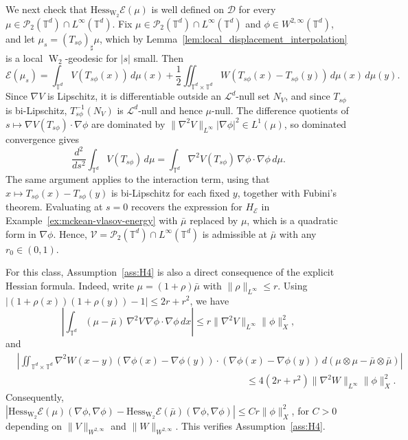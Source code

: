 \documentclass[11pt]{article}
\numberwithin{equation}{section}
\theoremstyle{definition}
\newcommand{\T}{\mathbb{T}}
\newcommand{\Pcal}{\mathcal{P}}
\newcommand{\E}{\mathcal{E}}
\newcommand{\Wtwo}{\operatorname{W}_2}
\begin{document}
We next check that $\mathrm{Hess}_{\Wtwo}\E(\mu)$ is well defined on $\mathscr{D}$ for every $\mu \in \Pcal_2(\T^d) \cap L^\infty(\T^d)$.
Fix $\mu \in \Pcal_2(\T^d) \cap L^\infty(\T^d)$ and $\phi \in W^{2,\infty}(\T^d)$, and let $\mu_s = (T_{s\phi})_\sharp\mu$, which by Lemma~\ref{lem:local_displacement_interpolation} is a
local $\Wtwo$-geodesic for $|s|$ small.
Then
\[
\E(\mu_s) = \int_{\T^d} V(T_{s\phi}(x)) \, d\mu(x) + \frac{1}{2} \iint_{\T^d \times \T^d} W (T_{s\phi}(x) - T_{s\phi}(y)) \, d\mu(x) \, d\mu(y).
\]
Since $\nabla V$ is Lipschitz, it is differentiable outside an $\mathcal{L}^d$-null set $N_V$, and since $T_{s\phi}$ is bi-Lipschitz, $T_{s\phi}^{-1}(N_V)$ is $\mathcal{L}^d$-null and hence $\mu$-null.
The difference quotients of $s \mapsto \nabla V(T_{s\phi}) \cdot \nabla\phi$ are dominated by $\|\nabla^2 V\|_{L^\infty} |\nabla\phi|^2 \in L^1(\mu)$, so dominated convergence gives
\[
\frac{d^2}{ds^2} \int_{\T^d} V(T_{s\phi}) \, d\mu = \int_{\T^d} \nabla^2 V(T_{s\phi}) \, \nabla\phi \cdot \nabla\phi \, d\mu.
\]
The same argument applies to the interaction term, using that $x \mapsto T_{s\phi}(x) - T_{s\phi}(y)$ is bi-Lipschitz for each fixed $y$, together with Fubini's theorem.
Evaluating at $s = 0$ recovers the expression for $H_\E$ in Example~\ref{ex:mckean-vlasov-energy} with $\bar\mu$ replaced by $\mu$, which is a quadratic form in $\nabla \phi$.
Hence, $\mathcal{V} = \Pcal_2(\T^d) \cap L^\infty(\T^d)$ is admissible at $\bar\mu$ with any $r_0 \in (0,1)$.

For this class, Assumption~\ref{ass:H4} is also a direct consequence of the explicit Hessian formula.
Indeed, write $\mu = (1 + \rho)\bar\mu$ with $\|\rho\|_{L^\infty} \le r$.
Using $|(1+\rho(x))(1+\rho(y))-1| \le 2r + r^2$, we have
\[
\left|\int_{\T^d}(\mu-\bar\mu) \, \nabla^2V \, \nabla\phi \cdot \nabla\phi \, dx\right| \le r\|\nabla^2V\|_{L^\infty}\|\phi\|_X^2,
\]
and
\begin{align*}
    &\left|\iint_{\T^d\times\T^d}\nabla^2W(x-y)(\nabla\phi(x)-\nabla\phi(y))\cdot(\nabla\phi(x)-\nabla\phi(y)) \, d(\mu \otimes \mu -\bar\mu \otimes \bar\mu)\right| \\
    &\hspace{10cm}\le 4(2r+r^2)\|\nabla^2W\|_{L^\infty}\|\phi\|_X^2.
\end{align*}
Consequently, $\left|\mathrm{Hess}_{\Wtwo}\E(\mu)(\nabla\phi,\nabla\phi) - \mathrm{Hess}_{\Wtwo}\E(\bar\mu)(\nabla\phi,\nabla\phi)\right| \le Cr\|\phi\|_X^2$, for $C > 0$ depending on $\|V\|_{W^{2,\infty}}$ and $\|W\|_{W^{2,\infty}}$.
This verifies Assumption~\ref{ass:H4}.
\end{document}
